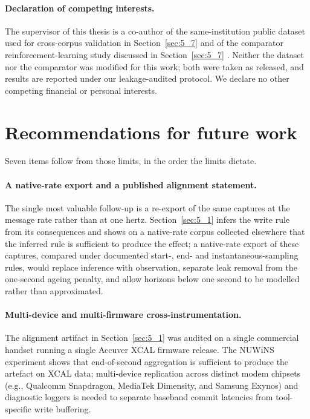 \paragraph{Declaration of competing interests.} The supervisor of this thesis is a co-author of the same-institution public dataset used for cross-corpus validation in Section~\ref{sec:5_7} \cite{ref38} and of the comparator reinforcement-learning study discussed in Section~\ref{sec:5_7} \cite{ref39}. Neither the dataset nor the comparator was modified for this work; both were taken as released, and results are reported under our leakage-audited protocol. We declare no other competing financial or personal interests.


\section{Recommendations for future work}
\label{sec:7_3}

Seven items follow from those limits, in the order the limits dictate.

\paragraph{A native-rate export and a published alignment statement.} The single most valuable follow-up is a re-export of the same captures at the message rate rather than at one hertz. Section~\ref{sec:5_1} infers the write rule from its consequences and shows on a native-rate corpus collected elsewhere that the inferred rule is sufficient to produce the effect; a native-rate export of these captures, compared under documented start-, end- and instantaneous-sampling rules, would replace inference with observation, separate leak removal from the one-second ageing penalty, and allow horizons below one second to be modelled rather than approximated.

\paragraph{Multi-device and multi-firmware cross-instrumentation.} The alignment artifact in Section~\ref{sec:5_1} was audited on a single commercial handset running a single Accuver XCAL firmware release. The NUWiNS experiment shows that end-of-second aggregation is sufficient to produce the artefact on XCAL data; multi-device replication across distinct modem chipsets (e.g., Qualcomm Snapdragon, MediaTek Dimensity, and Samsung Exynos) and diagnostic loggers is needed to separate baseband commit latencies from tool-specific write buffering.

